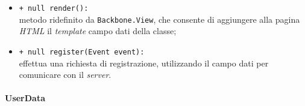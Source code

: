 \begin{flushleft}
\begin{itemize}
\begin{sloppypar}
\begin{itemize}
\item \texttt{+ null render():}\\ metodo ridefinito da \texttt{Backbone.View}, che consente di aggiungere alla pagina \textit{HTML} il \textit{template} campo dati della classe;
\item \texttt{+ null register(Event event):}\\ effettua una richiesta di registrazione, utilizzando il campo dati \model{} per comunicare con il \textit{server}.
\end{itemize}
\end{sloppypar}
\end{itemize}
\end{flushleft}

\paragraph{UserData}
\label{userData}

